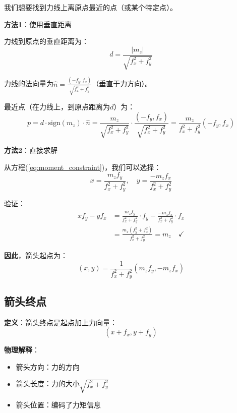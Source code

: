 \documentclass[12pt,a4paper]{article}
\begin{document}
我们想要找到力线上离原点最近的点（或某个特定点）。

\textbf{方法1}：使用垂直距离

力线到原点的垂直距离为：
\begin{equation}
d = \frac{|m_z|}{\sqrt{f_x^2 + f_y^2}}
\end{equation}

力线的法向量为$\hat{n} = \frac{(-f_y, f_x)}{\sqrt{f_x^2 + f_y^2}}$（垂直于力方向）。

最近点（在力线上，到原点距离为$d$）为：
\begin{equation}
p = d \cdot \text{sign}(m_z) \cdot \hat{n} = \frac{m_z}{\sqrt{f_x^2 + f_y^2}} \cdot \frac{(-f_y, f_x)}{\sqrt{f_x^2 + f_y^2}} = \frac{m_z}{f_x^2 + f_y^2}(-f_y, f_x)
\end{equation}

\textbf{方法2}：直接求解

从方程(\ref{eq:moment_constraint})，我们可以选择：
\begin{equation}
x = \frac{m_z f_y}{f_x^2 + f_y^2}, \quad y = \frac{-m_z f_x}{f_x^2 + f_y^2}
\end{equation}

验证：
\begin{align}
x f_y - y f_x &= \frac{m_z f_y}{f_x^2 + f_y^2} \cdot f_y - \frac{-m_z f_x}{f_x^2 + f_y^2} \cdot f_x \\
&= \frac{m_z (f_y^2 + f_x^2)}{f_x^2 + f_y^2} = m_z \quad \checkmark
\end{align}

\textbf{因此}，箭头起点为：
\begin{equation}
(x, y) = \frac{1}{f_x^2 + f_y^2} (m_z f_y, -m_z f_x)
\end{equation}

\subsection{箭头终点}

\textbf{定义}：箭头终点是起点加上力向量：
\begin{equation}
(x + f_x, y + f_y)
\end{equation}

\textbf{物理解释}：
\begin{itemize}
\item 箭头方向：力的方向
\item 箭头长度：力的大小$\sqrt{f_x^2 + f_y^2}$
\item 箭头位置：编码了力矩信息
\end{itemize}
\end{document}
